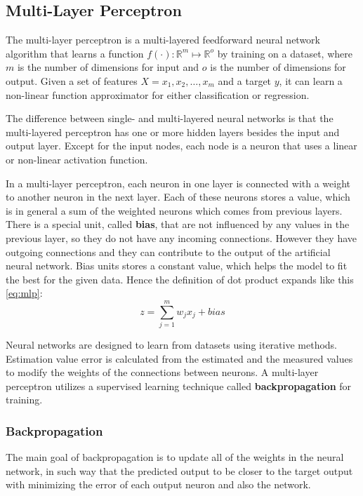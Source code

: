 \subsection{Multi-Layer Perceptron}

The multi-layer perceptron is a multi-layered feedforward neural network algorithm that learns a function $f(\cdot) : \mathbb{R}^m \mapsto \mathbb{R}^o$ by training on a dataset, where $m$ is the number of dimensions for input and $o$ is the number of dimensions for output. Given a set of features $X = x_1, x_2, \dots, x_m$ and a target $y$, it can learn a non-linear function approximator for either classification or regression. \medskip

The difference between single- and multi-layered neural networks is that the multi-layered perceptron has one or more hidden layers besides the input and output layer. Except for the input nodes, each node is a neuron that uses a linear or non-linear activation function. \medskip

In a multi-layer perceptron, each neuron in one layer is connected with a weight to another neuron in the next layer. Each of these neurons stores a value, which is in general a sum of the weighted neurons which comes from previous layers. There is a special unit, called \textbf{bias}, that are not influenced by any values in the previous layer, so they do not have any incoming connections. However they have outgoing connections and they can contribute to the output of the artificial neural network. Bias units stores a constant value, which helps the model to fit the best for the given data. Hence the definition of dot product expands like this \eqref{eq:mlp}:
\begin{equation} z = \sum_{j=1}^m w_j x_j + bias \label{eq:mlp} \end{equation}

Neural networks are designed to learn from datasets using iterative methods. Estimation value error is calculated from the estimated and the measured values to modify the weights of the connections between neurons. 
A multi-layer perceptron utilizes a supervised learning technique called \textbf{backpropagation} for training.


\subsubsection{Backpropagation}

The main goal of backpropagation \cite{chauvin2013backpropagation} is to update all of the weights in the neural network, in such way that the predicted output to be closer to the target output with minimizing the error of each output neuron and also the network.

